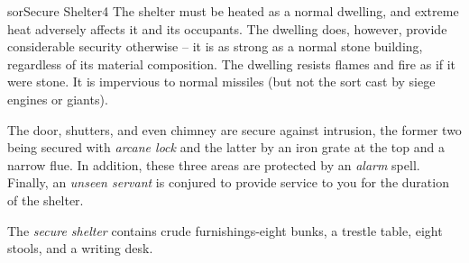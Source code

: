 \begin{spellcard}{sor}{Secure Shelter}{4}
  The shelter must be heated as a normal dwelling, and extreme heat adversely affects it and its occupants.
  The dwelling does, however, provide considerable security otherwise --
  it is as strong as a normal stone building, regardless of its material composition.
  The dwelling resists flames and fire as if it were stone.
  It is impervious to normal missiles (but not the sort cast by siege engines or giants).

  The door, shutters, and even chimney are secure against intrusion,
  the former two being secured with \emph{arcane lock}
  and the latter by an iron grate at the top and a narrow flue.
  In addition, these three areas are protected by an \emph{alarm} spell.
  Finally, an \emph{unseen servant} is conjured to provide service to you
  for the duration of the shelter.

  The \emph{secure shelter} contains crude furnishings-eight bunks, a
  trestle table, eight stools, and a writing desk.

\end{spellcard}
